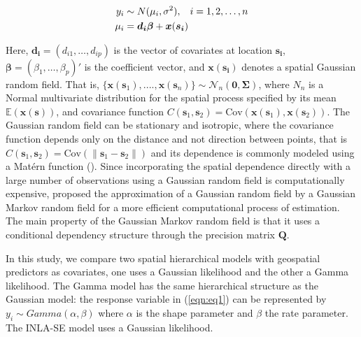 \documentclass{article}
\begin{document}
\begin{align}
y_i & \sim N(\mu_i, \sigma^2), \hspace{3mm} i = 1, 2, \ldots, n \label{eqn:eq1}\\
\mu_i & = \boldsymbol{d_i \beta} + \boldsymbol{x}(\boldsymbol{s_i}) \label{eqn:eq2}
\end{align}

 
Here, $\boldsymbol{d_i} = (d_{i1}, \ldots, d_{ip})$ is the vector of covariates at location $\boldsymbol{s_i}$, $\boldsymbol{\beta}=(\beta_1, \ldots, \beta_p)'$ is the coefficient vector, and $\boldsymbol{x}(\boldsymbol{s_i})$ denotes a spatial Gaussian random field. That is, $\{\boldsymbol{x}(\boldsymbol{s}_{1}),...., \boldsymbol{x}(\boldsymbol{s}_{n})\} \sim \mathcal{N}_{n}(\boldsymbol{0}, \boldsymbol{\Sigma})$, where $N_{n}$ is a Normal multivariate distribution for the spatial process specified by its mean $\mathbb{E}(\boldsymbol{x}(\boldsymbol{s}))$, and covariance function $C(\boldsymbol{s}_{1}, \boldsymbol{s}_{2}) = \text{Cov}(\boldsymbol{x}(\boldsymbol{s}_{1}), \boldsymbol{x}(\boldsymbol{s}_{2}))$. The Gaussian random field can be stationary and isotropic, where the covariance function depends only on the distance and not direction between points, that is $C(\boldsymbol{s}_{1}, \boldsymbol{s}_{2}) = \text{Cov}(\|\boldsymbol{s}_{1} - \boldsymbol{s}_{2}\|)$ and its dependence is commonly modeled using a Matérn function (\cite{stein2012interpolation, yuan2011models, diggleetal2013}). Since incorporating the spatial dependence directly with a large number of observations using a Gaussian random field is computationally expensive, \cite{rue2005gaussian} proposed the approximation of a Gaussian random field by a Gaussian Markov random field for a more efficient computational process of estimation. The main property of the Gaussian Markov random field is that it uses a conditional dependency structure through the precision matrix $\boldsymbol{Q}$. 




In this study, we compare two spatial hierarchical  models with geospatial predictors as covariates, one uses a Gaussian likelihood and the other a Gamma likelihood. The Gamma model has the same hierarchical structure as the Gaussian model: the response variable in (\ref{eqn:eq1}) can be represented by $y_{i} \sim Gamma(\alpha, \beta)$ where $\alpha$ is the shape parameter and $\beta$ the rate parameter. The INLA-SE model uses a Gaussian likelihood.
\end{document}
